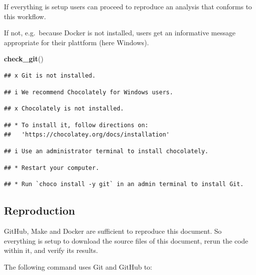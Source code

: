 \documentclass[12pt,a4paper,]{article}
\newenvironment{Shaded}{\begin{snugshade}}{\end{snugshade}}
\newcommand{\KeywordTok}[1]{\textcolor[rgb]{0.13,0.29,0.53}{\textbf{#1}}}
\newcommand{\NormalTok}[1]{#1}
\begin{document}
If everything is setup users can proceed to reproduce an analysis that conforms to this workflow.

If not, e.g.~because Docker is not installed, users get an informative message appropriate for their plattform (here Windows).

\begin{Shaded}
\begin{Highlighting}[]
\KeywordTok{check_git}\NormalTok{()}
\end{Highlighting}
\end{Shaded}

\begin{verbatim}
## x Git is not installed.
\end{verbatim}

\begin{verbatim}
## i We recommend Chocolately for Windows users.
\end{verbatim}

\begin{verbatim}
## x Chocolately is not installed.
\end{verbatim}

\begin{verbatim}
## * To install it, follow directions on:
##   'https://chocolatey.org/docs/installation'
\end{verbatim}

\begin{verbatim}
## i Use an administrator terminal to install chocolately.
\end{verbatim}

\begin{verbatim}
## * Restart your computer.
\end{verbatim}

\begin{verbatim}
## * Run `choco install -y git` in an admin terminal to install Git.
\end{verbatim}

\hypertarget{reproduction}{%
\subsection{Reproduction}\label{reproduction}}

GitHub, Make and Docker are sufficient to reproduce this document.
So everything is setup to download the source files of this document, rerun the code within it, and verify its results.

The following command uses Git and GitHub to:
\end{document}
